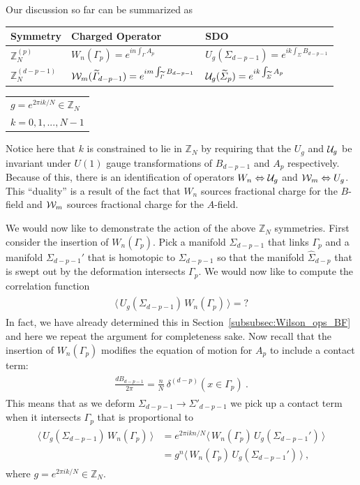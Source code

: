 \documentclass[11pt]{article}
\newcommand{\eq}[1]{\begin{align}\begin{split}#1\end{split}\end{align}}
\newcommand{\twopi}[1]{{\frac{#1}{2\pi}}}
\def\CW {{\cal W}}
\def\CU {{\cal U}}
\def\IZ{{\mathbb{Z}}}
\begin{document}
Our discussion so far can be summarized as
% 
\begin{center}
\begin{tabular}{|l|l|l|}
\hline
Symmetry & Charged Operator & SDO\\
\hline 
$\IZ_N^{(p)}$ & $W_n(\Gamma_p)=e^{i n \int_{\Gamma} A_p}$ & $U_g(\Sigma_{d-p-1})=e^{i k \int_\Sigma B_{d-p-1}}$ \\
$\IZ_N^{(d-p-1)}$ & $\CW_m(\widetilde\Gamma_{d-p-1})=e^{i m \int_{\widetilde\Gamma} B_{d-p-1}}$ & $\CU_g(\widetilde\Sigma_p)=e^{i k \int_{\widetilde\Sigma} A_p}$\\
\hline
\end{tabular}\begin{tabular}{l}
$g=e^{2\pi i k /N}\in \IZ_N$\\
$k=0,1,...,N-1$\\
\end{tabular}
\end{center}
%
Notice here that $k$ is constrained to lie in $\IZ_N$ by requiring that the $U_g$ and $\CU_g$ be invariant under $U(1)$ gauge transformations of $B_{d-p-1}$ and $A_p$ respectively. Because of this, there is an identification of operators $W_n\Leftrightarrow \CU_g$ and $\CW_m\Leftrightarrow U_g$. This ``duality'' is a result of the fact that $W_n$ sources fractional charge for the $B$-field and $\CW_m$ sources fractional charge for the $A$-field. 

We would now like to demonstrate the action of the above $\IZ_N$ symmetries. First consider the insertion of $W_n(\Gamma_p)$. Pick a manifold $\Sigma_{d-p-1}$ that links $\Gamma_p$ and a manifold $\Sigma_{d-p-1}'$ that is homotopic to $\Sigma_{d-p-1}$ so that the manifold $\widehat\Sigma_{d-p}$ that is swept out by the deformation intersects $\Gamma_p$. We would now like to compute the correlation function 
\eq{
\big\langle \,U_g(\Sigma_{d-p-1})\,W_n(\Gamma_p)\,\big\rangle=?
}
In fact, we have already determined this in Section~\ref{subsubsec:Wilson_ops_BF} and here we repeat the argument for completeness sake.
Now recall that the insertion of $W_n(\Gamma_p)$ modifies the equation of motion for $A_{p}$ to include a contact term:
\eq{
\twopi{dB_{d-p-1}}=\frac{n}{N}\ \delta^{(d-p)}(x\in \Gamma_p)~.
}
 This means that as we deform $\Sigma_{d-p-1}\to \Sigma'_{d-p-1}$ we pick up a contact term when it intersects $\Gamma_p$ that is proportional to 
\eq{
\big\langle\, U_g(\Sigma_{d-p-1})\,W_n(\Gamma_p)\,\big\rangle&=e^{2\pi i k n /N}\big\langle \,W_n(\Gamma_p)\,U_g(\Sigma_{d-p-1}')\,\big\rangle\\[0.1cm]
&=g^n\big\langle\, W_n(\Gamma_p)\,U_g(\Sigma_{d-p-1}')\,\big\rangle~,
}
where $g=e^{2\pi i k /N}\in \IZ_N$. 
\end{document}
